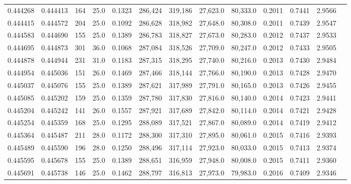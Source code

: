 \begin{tabular}{rrrrrrrrrrrrr}
0.444268 & 0.444413 &   164 & 25.0 &                                     0.1323 & 286,424 & 319,186 &  27,623.0 &  80,333.0 & 0.2011 & 0.7441 & 2.9566 \\
0.444415 & 0.444572 &   204 & 25.0 &                                     0.1092 & 286,628 & 318,982 &  27,648.0 &  80,308.0 & 0.2011 & 0.7439 & 2.9547 \\
0.444583 & 0.444690 &   155 & 25.0 &                                     0.1389 & 286,783 & 318,827 &  27,673.0 &  80,283.0 & 0.2012 & 0.7437 & 2.9533 \\
0.444695 & 0.444873 &   301 & 36.0 &                                     0.1068 & 287,084 & 318,526 &  27,709.0 &  80,247.0 & 0.2012 & 0.7433 & 2.9505 \\
0.444878 & 0.444944 &   231 & 31.0 &                                     0.1183 & 287,315 & 318,295 &  27,740.0 &  80,216.0 & 0.2013 & 0.7430 & 2.9484 \\
0.444954 & 0.445036 &   151 & 26.0 &                                     0.1469 & 287,466 & 318,144 &  27,766.0 &  80,190.0 & 0.2013 & 0.7428 & 2.9470 \\
0.445037 & 0.445076 &   155 & 25.0 &                                     0.1389 & 287,621 & 317,989 &  27,791.0 &  80,165.0 & 0.2013 & 0.7426 & 2.9455 \\
0.445085 & 0.445202 &   159 & 25.0 &                                     0.1359 & 287,780 & 317,830 &  27,816.0 &  80,140.0 & 0.2014 & 0.7423 & 2.9441 \\
0.445204 & 0.445242 &   141 & 26.0 &                                     0.1557 & 287,921 & 317,689 &  27,842.0 &  80,114.0 & 0.2014 & 0.7421 & 2.9428 \\
0.445254 & 0.445359 &   168 & 25.0 &                                     0.1295 & 288,089 & 317,521 &  27,867.0 &  80,089.0 & 0.2014 & 0.7419 & 2.9412 \\
0.445364 & 0.445487 &   211 & 28.0 &                                     0.1172 & 288,300 & 317,310 &  27,895.0 &  80,061.0 & 0.2015 & 0.7416 & 2.9393 \\
0.445489 & 0.445590 &   196 & 28.0 &                                     0.1250 & 288,496 & 317,114 &  27,923.0 &  80,033.0 & 0.2015 & 0.7413 & 2.9374 \\
0.445595 & 0.445678 &   155 & 25.0 &                                     0.1389 & 288,651 & 316,959 &  27,948.0 &  80,008.0 & 0.2015 & 0.7411 & 2.9360 \\
0.445691 & 0.445738 &   146 & 25.0 &                                     0.1462 & 288,797 & 316,813 &  27,973.0 &  79,983.0 & 0.2016 & 0.7409 & 2.9346 \\

\end{tabular}
